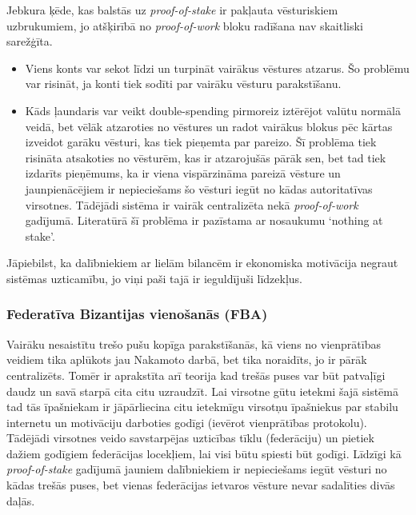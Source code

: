 Jebkura ķēde, kas balstās uz \textit{proof-of-stake} ir pakļauta vēsturiskiem uzbrukumiem, jo atšķirībā no \textit{proof-of-work} bloku radīšana nav skaitliski sarežģīta.
\begin{itemize}
    \item Viens konts var sekot līdzi un turpināt vairākus vēstures atzarus. Šo problēmu var risināt, ja konti tiek sodīti par vairāku vēsturu parakstīšanu.
    \item Kāds ļaundaris var veikt double-spending pirmoreiz iztērējot valūtu normālā veidā, bet vēlāk atzaroties no vēstures un radot vairākus blokus pēc kārtas izveidot garāku vēsturi, kas tiek pieņemta par pareizo. Šī problēma tiek risināta atsakoties no vēsturēm, kas ir atzarojušās pārāk sen, bet tad tiek izdarīts pieņēmums, ka ir viena vispārzināma pareizā vēsture un jaunpienācējiem ir nepieciešams šo vēsturi iegūt no kādas autoritatīvas virsotnes. Tādējādi sistēma ir vairāk centralizēta nekā \textit{proof-of-work} gadījumā.\cite{poelstra15} Literatūrā šī problēma ir pazīstama ar nosaukumu `nothing at stake'.
\end{itemize}
Jāpiebilst, ka dalībniekiem ar lielām bilancēm ir ekonomiska motivācija negraut sistēmas uzticamību, jo viņi paši tajā ir ieguldījuši līdzekļus.

\subsubsection{Federatīva Bizantijas vienošanās (FBA)}
Vairāku nesaistītu trešo pušu kopīga parakstīšanās, kā viens no vienprātības veidiem tika aplūkots jau Nakamoto darbā\cite{nakamoto08}, bet tika noraidīts, jo ir pārāk centralizēts. Tomēr ir aprakstīta arī teorija kad trešās puses var būt patvaļīgi daudz un savā starpā cita citu uzraudzīt.\cite{mazieres15}
Lai virsotne gūtu ietekmi šajā sistēmā tad tās īpašniekam ir jāpārliecina citu ietekmīgu virsotņu īpašniekus par stabilu internetu un motivāciju darboties godīgi (ievērot vienprātības protokolu). Tādējādi virsotnes veido savstarpējas uzticības tīklu (federāciju) un pietiek dažiem godīgiem federācijas locekļiem, lai visi būtu spiesti būt godīgi. Līdzīgi kā \textit{proof-of-stake} gadījumā jauniem dalībniekiem ir nepieciešams iegūt vēsturi no kādas trešās puses, bet vienas federācijas ietvaros vēsture nevar sadalīties divās daļās.


